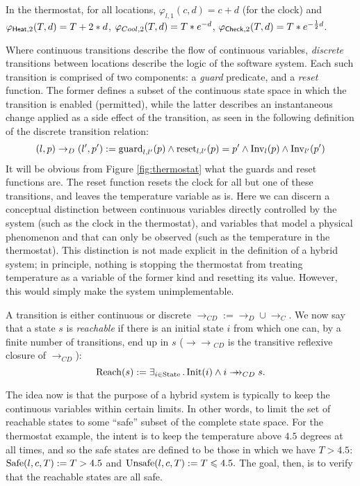 \documentclass[runningheads]{llncs}
\renewcommand{\leq}{\leqslant}
\newcommand{\Exists}[2]{\exists_{#1} \, . \, #2}
\def\phi{\varphi}
\newcommand{\weg}[1]{}
\newcommand{\Heat}{{\sf Heat}}
\newcommand{\Cool}{{\sf Cool}}
\newcommand{\Chec}{{\sf Check}}
\newcommand{\State}{{\rm State}}
\newcommand{\Inv}{{\rm Inv}}
\newcommand{\Init}{{\rm Init}}
\newcommand{\Unsafe}{{\rm Unsafe}}
\newcommand{\Safe}{{\rm Safe}}
\newcommand{\Reach}{{\rm Reach}}
\newcommand{\guard}{{\rm guard}}
\newcommand{\reset}{{\rm reset}}
\newcommand{\trans}{\rightarrow_{CD}}
\newcommand{\doubleheadrightarrow}{\mathrel{\rightarrow\!\!\!\!\rightarrow}}
\newcommand{\ttrans}{\doubleheadrightarrow_{CD}}
\newcommand{\contrans}{\rightarrow_C}
\newcommand{\distrans}{\rightarrow_D}
\begin{document}
In the thermostat, for all locations, $\phi_{l,1}(c,d) = c + d$ (for
the clock) and $\phi_{\Heat,2}(T,d)= T + 2 * d$,
$\phi_{\\Cool,2}(T,d)= T * e^{-d}$, $\phi_{\Chec,2}(T,d)= T * e^{-
  \frac{1}{2}d}$.

Where continuous transitions describe the flow of continuous
variables, \emph{discrete} transitions between locations describe the
logic of the software system. Each such transition is comprised of two
components: a \emph{guard} predicate, and a \emph{reset} function. The
former defines a subset of the continuous state space in which the
transition is enabled (permitted), while the latter describes an
instantaneous change applied as a side effect of the transition, as
seen in the following definition of the discrete transition relation:
$$ (l,p) \distrans (l',p') := \guard_{l,l'}(p) \wedge \reset_{l,l'}(p)= p' \wedge \Inv_l(p) \wedge \Inv_{l'}(p')$$
It will be obvious from Figure \ref{fig:thermostat} what the guards
and reset functions are. The reset function resets the clock for all
but one of these transitions, and leaves the temperature variable as
is. Here we can discern a conceptual distinction between continuous
variables directly controlled by the system (such as the clock in the
thermostat), and variables that model a physical phenomenon and that
can only be observed (such as the temperature in the thermostat). This
distinction is not made explicit in the definition of a hybrid system;
in principle, nothing is stopping the thermostat from treating
temperature as a variable of the former kind and resetting its
value. However, this would simply make the system unimplementable.


A transition is either continuous or discrete $\trans:= \distrans \cup \contrans$. We now say that a state $s$ is \emph{reachable} if there is an initial state $i$ from which one can, by a finite number of transitions, end up in $s$ ($\ttrans$ is the transitive reflexive closure of $\trans$):
$$\Reach(s):=
    \Exists{i\in \State}{\Init(i) \wedge i \ttrans s}.$$
\weg{As mentioned before, the set of reachable states represents the
possible behaviours exhibited by a hypothetical real-world
implementation of the hybrid system (as software running on a device
with sensors and actuators).
}

The idea now is that the purpose of a hybrid system is typically to
keep the continuous variables within certain limits. In other words,
to limit the set of reachable states to some ``safe'' subset of the
complete state space. For the thermostat example, the intent is to
keep the temperature above $4.5$ degrees at all times, and so the safe
states are defined to be those in which we have $T > 4.5$: $\Safe(l,c,T) := T >4.5$ and $\Unsafe(l,c,T) := T\leq 4.5.$
The goal, then, is to verify that the reachable states are all safe.
\end{document}

